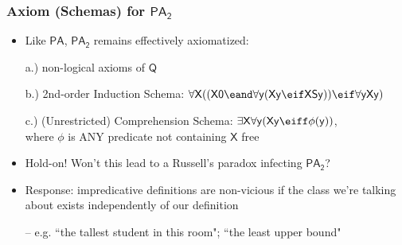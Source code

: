 \begin{frame}
\frametitle{Axiom (Schemas) for $\mathsf{PA_2}$ }

\begin{itemize}[<+->]

\item Like $\mathsf{PA}$, $\mathsf{PA_2}$ remains effectively axiomatized:

\item[a.)] non-logical axioms of $\mathsf{Q}$

\item[b.)]  2nd-order Induction Schema: $\mathsf{\forall X ((X0 \eand \forall y (Xy \eif X Sy)) \eif \forall y X y)}$

\item[c.)] (Unrestricted) Comprehension Schema: $\mathsf{\exists X \forall y (Xy \eiff \phi(y))}$, \\ where $\phi$ is ANY predicate not containing $\mathsf{X}$ free

\item Hold-on! Won't this lead to a Russell's paradox infecting $\mathsf{PA_2}$?

\item Response: impredicative definitions are non-vicious if the class we're talking about exists independently of our definition
\item[] -- e.g. ``the tallest student in this room"; ``the least upper bound"


\end{itemize}
\end{frame}


